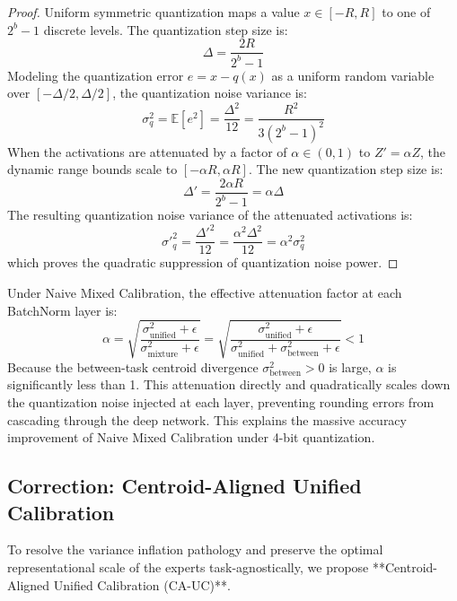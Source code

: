 \documentclass{article}
\theoremstyle{plain}
\theoremstyle{definition}
\theoremstyle{remark}
\begin{document}
\begin{proof}
Uniform symmetric quantization maps a value $x \in [-R, R]$ to one of $2^b - 1$ discrete levels. The quantization step size is:
\begin{equation}
    \Delta = \frac{2R}{2^b - 1}
\end{equation}
Modeling the quantization error $e = x - q(x)$ as a uniform random variable over $[-\Delta/2, \Delta/2]$, the quantization noise variance is:
\begin{equation}
    \sigma^2_q = \mathbb{E}[e^2] = \frac{\Delta^2}{12} = \frac{R^2}{3(2^b - 1)^2}
\end{equation}
When the activations are attenuated by a factor of $\alpha \in (0, 1)$ to $Z' = \alpha Z$, the dynamic range bounds scale to $[- \alpha R, \alpha R]$. The new quantization step size is:
\begin{equation}
    \Delta' = \frac{2 \alpha R}{2^b - 1} = \alpha \Delta
\end{equation}
The resulting quantization noise variance of the attenuated activations is:
\begin{equation}
    \sigma'^2_q = \frac{\Delta'^2}{12} = \frac{\alpha^2 \Delta^2}{12} = \alpha^2 \sigma^2_q
\end{equation}
which proves the quadratic suppression of quantization noise power.
\end{proof}

Under Naive Mixed Calibration, the effective attenuation factor at each BatchNorm layer is:
\begin{equation}
    \alpha = \sqrt{\frac{\sigma^2_{\text{unified}} + \epsilon}{\sigma^2_{\text{mixture}} + \epsilon}} = \sqrt{\frac{\sigma^2_{\text{unified}} + \epsilon}{\sigma^2_{\text{unified}} + \sigma^2_{\text{between}} + \epsilon}} < 1
\end{equation}
Because the between-task centroid divergence $\sigma^2_{\text{between}} > 0$ is large, $\alpha$ is significantly less than 1. This attenuation directly and quadratically scales down the quantization noise injected at each layer, preventing rounding errors from cascading through the deep network. This explains the massive accuracy improvement of Naive Mixed Calibration under 4-bit quantization.

\subsection{Correction: Centroid-Aligned Unified Calibration}
To resolve the variance inflation pathology and preserve the optimal representational scale of the experts task-agnostically, we propose **Centroid-Aligned Unified Calibration (CA-UC)**. 
\end{document}
